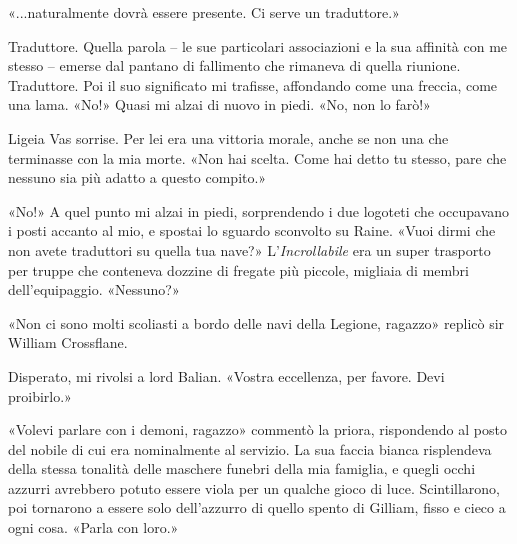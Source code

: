 «...naturalmente dovrà essere presente. Ci serve un traduttore.»

Traduttore. Quella parola -- le sue particolari associazioni e la sua
affinità con me stesso -- emerse dal pantano di fallimento che rimaneva
di quella riunione. Traduttore. Poi il suo significato mi trafisse,
affondando come una freccia, come una lama. «No!» Quasi mi alzai di
nuovo in piedi. «No, non lo farò!»

Ligeia Vas sorrise. Per lei era una vittoria morale, anche se non una
che terminasse con la mia morte. «Non hai scelta. Come hai detto tu
stesso, pare che nessuno sia più adatto a questo compito.»

«No!» A quel punto mi alzai in piedi, sorprendendo i due logoteti che
occupavano i posti accanto al mio, e spostai lo sguardo sconvolto su
Raine. «Vuoi dirmi che non avete traduttori su quella tua nave?»
L'\emph{Incrollabile} era un super trasporto per truppe che conteneva
dozzine di fregate più piccole, migliaia di membri dell'equipaggio.
«Nessuno?»

«Non ci sono molti scoliasti a bordo delle navi della Legione, ragazzo»
replicò sir William Crossflane.

Disperato, mi rivolsi a lord Balian. «Vostra eccellenza, per favore.
Devi proibirlo.»

«Volevi parlare con i demoni, ragazzo» commentò la priora, rispondendo
al posto del nobile di cui era nominalmente al servizio. La sua faccia
bianca risplendeva della stessa tonalità delle maschere funebri della
mia famiglia, e quegli occhi azzurri avrebbero potuto essere viola per
un qualche gioco di luce. Scintillarono, poi tornarono a essere solo
dell'azzurro di quello spento di Gilliam, fisso e cieco a ogni cosa.
«Parla con loro.»

